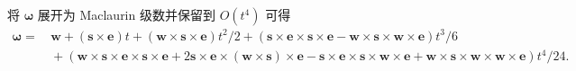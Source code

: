 \documentclass{article}
\begin{document}
将 $\boldsymbol\omega$ 展开为 Maclaurin 级数并保留到 $O\!\left(t^4\right)$ 可得
\begin{equation}
\begin{split}
	\boldsymbol\omega=&\,\mathbf w+\left(\mathbf s\times\mathbf e\right)t
		+\left(\mathbf w\times\mathbf s\times\mathbf e\right)t^2/2
		+\left(
			\mathbf s\times\mathbf e\times\mathbf s\times\mathbf e
			-\mathbf w\times\mathbf s\times\mathbf w\times\mathbf e
		\right)t^3/6\\
		&\,+\left(
			\mathbf w\times\mathbf s\times\mathbf e\times\mathbf s\times\mathbf e
			+2\mathbf s\times\mathbf e\times\left(\mathbf w\times\mathbf s\right)\times\mathbf e
			-\mathbf s\times\mathbf e\times\mathbf s\times\mathbf w\times\mathbf e
			+\mathbf w\times\mathbf s\times\mathbf w\times\mathbf w\times\mathbf e
		\right)t^4/24.
\end{split}
\end{equation}
\end{document}
